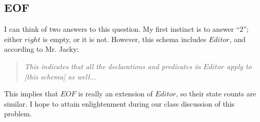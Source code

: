 \documentclass[11pt]{article}
\begin{document}
\subsection{EOF}

I can think of two answers to this question.  My first instinct is to answer ``2''; either $right$
is empty, or it is not.  However, this schema includes $Editor$, and according to Mr. Jacky:

\begin{quote}
  \textit{This indicates that all the declarations and predicates in $Editor$ apply to [this schema] as well...}
\end{quote}

This implies that $EOF$ is really an extension of $Editor$, so their state counts are similar.  I
hope to attain enlightenment during our class discussion of this problem.
\end{document}
